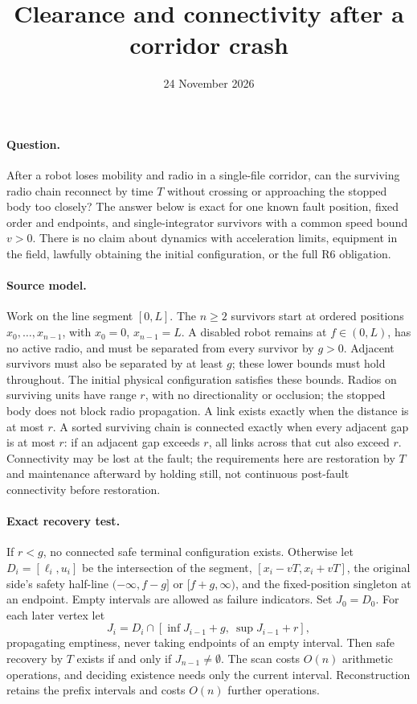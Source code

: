 \documentclass[11pt]{article}
\title{Clearance and connectivity after a corridor crash}
\date{24 November 2026}
\begin{document}
\maketitle

\paragraph{Question.} After a robot loses mobility and radio in a single-file
corridor, can the surviving radio chain reconnect by time \(T\) without
crossing or approaching the stopped body too closely? The answer below
is exact for one known fault position, fixed order and endpoints, and
single-integrator survivors with a common speed bound \(v>0\).
There is no claim about dynamics with acceleration limits, equipment in
the field, lawfully obtaining the initial configuration, or the full R6
obligation.

\paragraph{Source model.} Work on the line segment \([0,L]\).
The \(n\geq 2\) survivors start at ordered positions \(x_0,\dots,x_{n-1}\),
with \(x_0=0\), \(x_{n-1}=L\). A disabled robot remains at \(f\in(0,L)\),
has no active radio, and must be separated from every survivor by \(g>0\).
Adjacent survivors must also be separated by at least \(g\); these lower
bounds must hold throughout. The initial physical configuration satisfies
these bounds. Radios on surviving units have range \(r\), with no
directionality or occlusion; the stopped body does not block radio
propagation. A link exists exactly when the distance is at most \(r\).
A sorted surviving chain is connected exactly when every adjacent gap is
at most \(r\): if an adjacent gap exceeds \(r\), all links across that cut
also exceed \(r\). Connectivity may be lost at the fault; the requirements
here are restoration by \(T\) and maintenance afterward by holding still,
not continuous post-fault connectivity before restoration.

\paragraph{Exact recovery test.} If \(r<g\), no connected safe terminal configuration exists.
Otherwise let \(D_i=[\ell_i,u_i]\) be the intersection of the segment,
\([x_i-vT,x_i+vT]\), the original side's safety half-line
\((-\infty,f-g]\) or \([f+g,\infty)\), and the fixed-position singleton at
an endpoint. Empty intervals are allowed as failure indicators.
Set \(J_0=D_0\). For each later vertex let
\[
  J_i = D_i\cap [\inf J_{i-1}+g,\ \sup J_{i-1}+r],
\]
propagating emptiness, never taking endpoints of an empty interval.
Then safe recovery by \(T\) exists if and only if \(J_{n-1}\ne\emptyset\).
The scan costs \(O(n)\) arithmetic operations, and deciding existence
needs only the current interval. Reconstruction retains the prefix
intervals and costs \(O(n)\) further operations.
\end{document}
